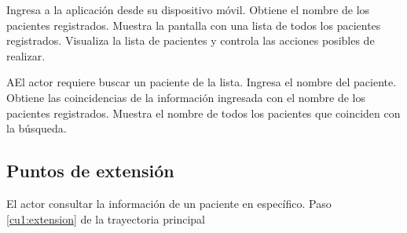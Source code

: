 \begin{UCtrayectoria}
	\UCpaso[\UCactor] Ingresa a la aplicación desde su dispositivo móvil.
	\UCpaso[\UCsist] Obtiene el nombre de los pacientes registrados.
	\UCpaso[\UCsist] Muestra la pantalla  con una lista de todos los pacientes registrados.
	\UCpaso[\UCactor] \label{cu1:extension}Visualiza la lista de pacientes y controla las acciones posibles de realizar. 	
\end{UCtrayectoria}


\begin{UCtrayectoriaA}{A}{El actor requiere buscar un paciente de la lista.}
	\UCpaso[\UCactor] Ingresa el nombre del paciente.
	\UCpaso[\UCsist] Obtiene las coincidencias de la información ingresada con el nombre de los pacientes registrados.
	\UCpaso[\UCsist] Muestra el nombre de todos los pacientes que coinciden con la búsqueda.
\end{UCtrayectoriaA}





\subsection{Puntos de extensión}
\UCExtensionPoint
{El actor consultar la información de un paciente en específico.}
{Paso \ref{cu1:extension} de la trayectoria principal}
{}